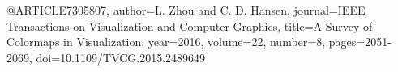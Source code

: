 @ARTICLE{7305807,
  author={L. {Zhou} and C. D. {Hansen}},
  journal={IEEE Transactions on Visualization and Computer Graphics}, 
  title={A Survey of Colormaps in Visualization}, 
  year={2016},
  volume={22},
  number={8},
  pages={2051-2069},
  doi={10.1109/TVCG.2015.2489649}}
